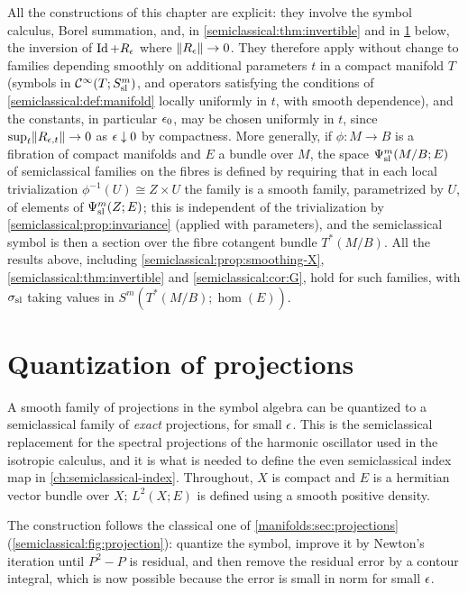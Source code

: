 \begin{remark}\label{semiclassical:rem:parameters}
  All the constructions of this chapter are explicit: they involve the symbol
  calculus, Borel summation, and, in \cref{semiclassical:thm:invertible} and in
  \cref{semiclassical:sec:projections} below, the inversion of $\operatorname{Id}+R_\epsilon$ where
  $\lVert R_\epsilon\rVert\to0$. They therefore apply without change to families depending
  smoothly on additional parameters $t$ in a compact manifold $T$ (symbols in
  $\mathcal{C}^\infty(T;S^{m}_{\mathrm{sl}})$, and operators satisfying the conditions of
  \cref{semiclassical:def:manifold} locally uniformly in $t$, with smooth dependence),
  and the constants, in particular $\epsilon_0$, may be chosen uniformly in $t$, since
  $\sup_t\lVert R_{\epsilon,t}\rVert\to0$ as $\epsilon\downarrow0$ by compactness. More generally,
  if $\phi:M\to B$ is a fibration of compact manifolds and $E$ a bundle over $M$,
  the space $\Psi^{m}_{\mathrm{sl}}(M/B;E)$ of semiclassical families on the fibres is defined by
  requiring that in each local trivialization $\phi^{-1}(U)\cong Z\times U$ the family
  is a smooth family, parametrized by $U$, of elements of $\Psi^{m}_{\mathrm{sl}}(Z;E)$; this is
  independent of the trivialization by \cref{semiclassical:prop:invariance} (applied
  with parameters), and the semiclassical symbol is then a section over the fibre
  cotangent bundle $T^*(M/B)$. All the results above, including
  \cref{semiclassical:prop:smoothing-X}, \cref{semiclassical:thm:invertible} and
  \cref{semiclassical:cor:G}, hold for such families, with $\sigma_{\mathrm{sl}}$ taking values in
  $S^m(T^*(M/B);\hom(E))$.
\end{remark}

\section{Quantization of projections}\label{semiclassical:sec:projections}

A smooth family of projections in the symbol algebra can be quantized to a
semiclassical family of \emph{exact} projections, for small $\epsilon$. This is the
semiclassical replacement for the spectral projections of the harmonic
oscillator used in the isotropic calculus, and it is what is needed to define
the even semiclassical index map in \cref{ch:semiclassical-index}. Throughout,
$X$ is compact and $E$ is a hermitian vector bundle over $X$; $L^2(X;E)$ is
defined using a smooth positive density.

The construction follows the classical one of \cref{manifolds:sec:projections}
(\cref{semiclassical:fig:projection}): quantize the symbol, improve it by
Newton's iteration until $P^2-P$ is residual, and then remove the residual
error by a contour integral, which is now possible because the error is small
in norm for small $\epsilon$.

